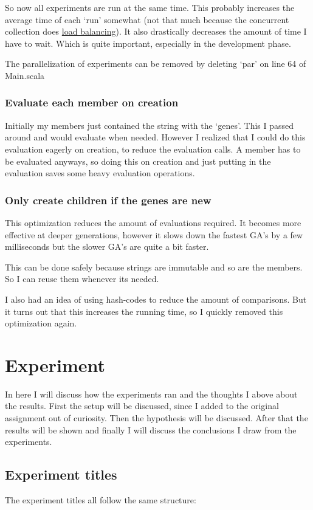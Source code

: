 \documentclass{article}
\begin{document}
\begin{empfile}
So now all experiments are run at the same time. This probably increases the
average time of each `run' somewhat (not that much because the concurrent
collection does \href{http://docs.scala-lang.org/overviews/parallel-collections/configuration.html}{load balancing}).
It also drastically decreases the amount of time I have to wait. Which is quite
important, especially in the development phase.

The parallelization of experiments can be removed by deleting `par' on line 64
of Main.scala

\subsubsection{Evaluate each member on creation}
Initially my members just contained the string with the `genes'. This I passed
around and would evaluate when needed. However I realized that I could do this
evaluation eagerly on creation, to reduce the evaluation calls. A member has
to be evaluated anyways, so doing this on creation and just putting in the
evaluation saves some heavy evaluation operations.

\subsubsection{Only create children if the genes are new}
This optimization reduces the amount of evaluations required.  It becomes 
more effective at deeper generations, however it slows down the fastest 
GA's by a few milliseconds but the slower GA's  are quite a bit faster.

This can be done safely because strings are immutable and so are the members.
So I can reuse them whenever its needed.

I also had an idea of using hash-codes to reduce the amount of comparisons.
But it turns out that this increases the running time, so I quickly removed
this optimization again.

\section{Experiment}
In here I will discuss how the experiments ran and the thoughts I
above about the results.
First the setup will be discussed, since I added to the
original assignment out of curiosity. Then the hypothesis
will be discussed. After that the results will be shown
and finally I will discuss the conclusions I draw from the experiments.

\subsection{Experiment titles}
The experiment titles all follow the same structure:


\end{empfile}
\end{document}
